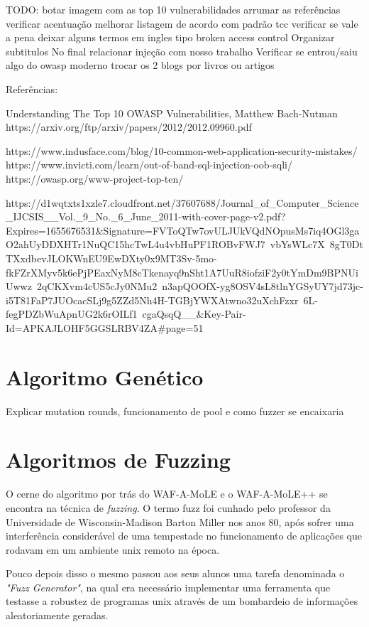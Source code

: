 TODO:
botar imagem com as top 10 vulnerabilidades
arrumar as referências
verificar acentuação
melhorar listagem de acordo com padrão tcc
verificar se vale a pena deixar alguns termos em ingles tipo broken access control
Organizar subtitulos
No final relacionar injeção com nosso trabalho
Verificar se entrou/saiu algo do owasp moderno
trocar os 2 blogs por livros ou artigos

Referências:

Understanding The Top 10 OWASP Vulnerabilities, Matthew Bach-Nutman
https://arxiv.org/ftp/arxiv/papers/2012/2012.09960.pdf

https://www.indusface.com/blog/10-common-web-application-security-mistakes/
https://www.invicti.com/learn/out-of-band-sql-injection-oob-sqli/
https://owasp.org/www-project-top-ten/

https://d1wqtxts1xzle7.cloudfront.net/37607688/Journal_of_Computer_Science_IJCSIS__Vol._9_No._6_June_2011-with-cover-page-v2.pdf?Expires=1655676531&Signature=FVToQTw7ovULJUkVQdNOpusMs7iq4OGl3gaO2ahUyDDXHTr1NuQC15hcTwL4u4vbHuPF1ROBvFWJ7~vbYsWLc7X~8gT0DtTXxdbevJLOKWnEU9EwDXty0x9MT3Sv-5mo-fkFZrXMyv5k6ePjPEaxNyM8cTkenayq9nSht1A7UuR8iofziF2y0tYmDm9BPNUiUwwz~2qCKXvm4cUS5cJy0NMu2~n3apQOOfX-yg8OSV4sL8tlnYGSyUY7jd73jc-i5T81FaP7JUOcacSLj9g5ZZd5Nh4H-TGBjYWXAtwno32uXchFzxr~6L-fegPDZbWuApnUG2k6rOILf1~cgaQsqQ__&Key-Pair-Id=APKAJLOHF5GGSLRBV4ZA#page=51

\section{Algoritmo Genético}

Explicar mutation rounds, funcionamento de pool e como fuzzer se encaixaria

\section{Algoritmos de Fuzzing}

O cerne do algoritmo por trás do WAF-A-MoLE e o WAF-A-MoLE++ se encontra na técnica de \textit{fuzzing}. O termo fuzz foi cunhado pelo professor da Universidade de Wisconsin-Madison Barton Miller nos anos 80, após sofrer uma interferência considerável de uma tempestade no funcionamento de aplicações que rodavam em um ambiente unix remoto na época. 

Pouco depois disso o mesmo passou aos seus alunos uma tarefa denominada o \textit{"Fuzz Generator"}, na qual era necessário implementar uma ferramenta que testasse a robustez de programas unix através de um bombardeio de informações aleatoriamente geradas.

